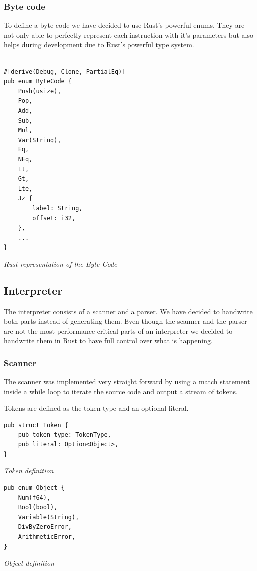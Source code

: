 \documentclass{article}
\begin{document}
\subsubsection{Byte code}
\label{sec:byte_code}

To define a byte code we have decided to use Rust's powerful enums. They are
not only able to perfectly represent each instruction with it's parameters but
also helps during development due to Rust's powerful type system.

\begin{verbatim}

#[derive(Debug, Clone, PartialEq)]
pub enum ByteCode {
    Push(usize),
    Pop,
    Add,
    Sub,
    Mul,
    Var(String),
    Eq,
    NEq,
    Lt,
    Gt,
    Lte,
    Jz {
        label: String,
        offset: i32,
    },
    ...
}

\end{verbatim}
\textit{Rust representation of the Byte Code} \\

\subsection{Interpreter}
The interpreter consists of a scanner and a parser. We have decided to
handwrite both parts instead of generating them. Even though the scanner and
the parser are not the most performance critical parts of an interpreter we
decided to handwrite them in Rust to have full control over what is happening.

\subsubsection{Scanner}
The scanner was implemented very straight forward by using a match statement
inside a while loop to iterate the source code and output a stream of tokens.

Tokens are defined as the token type and an optional literal.

\begin{verbatim}
pub struct Token {
    pub token_type: TokenType,
    pub literal: Option<Object>,
}
\end{verbatim}
\textit{Token definition}

\begin{verbatim}
pub enum Object {
    Num(f64),
    Bool(bool),
    Variable(String),
    DivByZeroError,
    ArithmeticError,
}
\end{verbatim}
\textit{Object definition}
\end{document}
